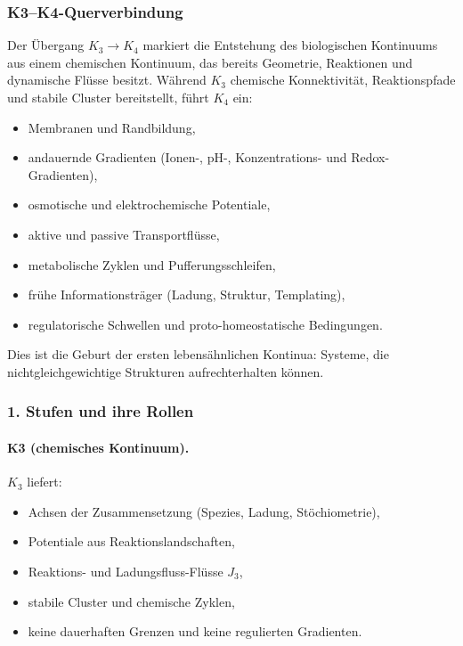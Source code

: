 
\subsubsection{K3–K4-Querverbindung}
\label{sec:crossk-k3-k4}

Der Übergang $K_3 \rightarrow K_4$ markiert die Entstehung des biologischen
Kontinuums aus einem chemischen Kontinuum, das bereits Geometrie, Reaktionen und
dynamische Flüsse besitzt. Während $K_3$ chemische Konnektivität, Reaktionspfade
und stabile Cluster bereitstellt, führt $K_4$ ein:
\begin{itemize}
  \item Membranen und Randbildung,
  \item andauernde Gradienten (Ionen-, pH-, Konzentrations- und Redox-Gradienten),
  \item osmotische und elektrochemische Potentiale,
  \item aktive und passive Transportflüsse,
  \item metabolische Zyklen und Pufferungsschleifen,
  \item frühe Informationsträger (Ladung, Struktur, Templating),
  \item regulatorische Schwellen und proto-homeostatische Bedingungen.
\end{itemize}

Dies ist die Geburt der ersten lebensähnlichen Kontinua: Systeme, die
nichtgleichgewichtige Strukturen aufrechterhalten können.

\subsubsection{1. Stufen und ihre Rollen}

\paragraph{K3 (chemisches Kontinuum).}
$K_3$ liefert:
\begin{itemize}
  \item Achsen der Zusammensetzung (Spezies, Ladung, Stöchiometrie),
  \item Potentiale aus Reaktionslandschaften,
  \item Reaktions- und Ladungsfluss-Flüsse $J_3$,
  \item stabile Cluster und chemische Zyklen,
  \item keine dauerhaften Grenzen und keine regulierten Gradienten.
\end{itemize}

